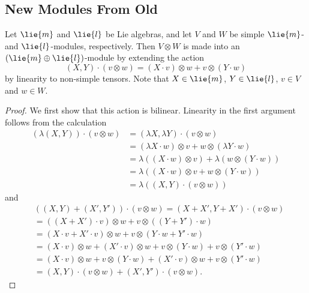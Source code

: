 \documentclass[fleqn]{NotesClass}
\begin{document}
    \subsection{New Modules From Old}
    \begin{lma}{}{}
        Let \(\lie{m}\) and \(\lie{l}\) be Lie algebras, and let \(V\) and \(W\) be simple \(\lie{m}\)- and \(\lie{l}\)-modules, respectively.
        Then \(V \otimes W\) is made into an \((\lie{m} \oplus \lie{l})\)-module by extending the action
        \begin{equation}
            (X, Y) \cdot (v \otimes w) = (X \cdot v) \otimes w + v \otimes (Y \cdot w)
        \end{equation}
        by linearity to non-simple tensors.
        Note that \(X \in \lie{m}\), \(Y \in \lie{l}\), \(v \in V\) and \(w \in W\).
        \begin{proof}
            We first show that this action is bilinear.
            Linearity in the first argument follows from the calculation
            \begin{align}
                (\lambda(X, Y)) \cdot (v \otimes w) &= (\lambda X, \lambda Y) \cdot (v \otimes w)\\
                &= (\lambda X \cdot w) \otimes v + w \otimes (\lambda Y \cdot w)\\
                &= \lambda ((X \cdot w) \otimes v) + \lambda (w \otimes (Y \cdot w))\\
                &= \lambda ((X \cdot w) \otimes v + w \otimes (Y \cdot w))\\
                &= \lambda ((X, Y) \cdot (v \otimes w))
            \end{align}
            and
            \begin{align}
                &((X, Y) + (X', Y')) \cdot (v \otimes w) = (X + X', Y + X') \cdot (v \otimes w)\\
                &= ((X + X') \cdot v) \otimes w + v \otimes ((Y + Y') \cdot w)\\
                &= (X \cdot v + X' \cdot v) \otimes w + v \otimes (Y \cdot w + Y' \cdot w)\\
                &= (X \cdot v) \otimes w + (X' \cdot v) \otimes w + v \otimes (Y \cdot w) + v \otimes (Y' \cdot w)\\
                &= (X \cdot v) \otimes w + v \otimes (Y \cdot w) + (X' \cdot v) \otimes w + v \otimes (Y' \cdot w)\\
                &= (X, Y) \cdot (v \otimes w) + (X', Y') \cdot (v \otimes w).

\end{align}
\end{proof}
\end{lma}
\end{document}
